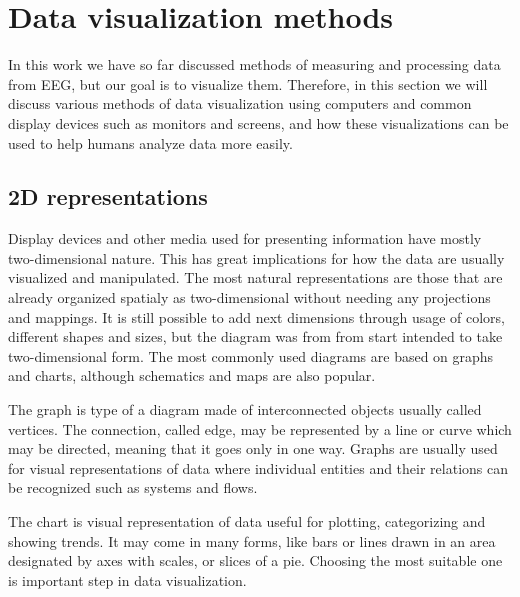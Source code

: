 \section{Data visualization methods}
In this work we have so far discussed methods of measuring and processing data
from EEG, but our goal is to visualize them. Therefore, in this section we will
discuss various methods of data visualization using computers and common display
devices such as monitors and screens, and how these visualizations can be used
to help humans analyze data more easily.

\subsection{2D representations}
Display devices and other media used for presenting information have
mostly two-dimensional nature. This has great implications for how the data are
usually visualized and manipulated. The most natural representations are those
that are already organized spatialy as two-dimensional without needing any
projections and mappings. It is still possible to add next dimensions through
usage of colors, different shapes and sizes, but the diagram was from from start
intended to take two-dimensional form. The most commonly used diagrams are based
on graphs and charts, although schematics and maps are also popular.

The graph is type of a diagram made of interconnected objects usually called
vertices. The connection, called edge, may be represented by a line or curve
which may be directed, meaning that it goes only in one way. Graphs are usually
used for visual representations of data where individual entities and
their relations can be recognized such as systems and flows.

The chart is visual representation of data useful for plotting, categorizing and
showing trends. It may come in many forms, like bars or lines drawn in an
area designated by axes with scales, or slices of a pie. Choosing the most
suitable one is important step in data visualization.

